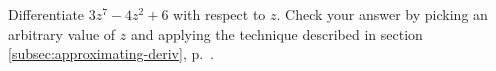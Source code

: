 Differentiate $3z^7-4z^2+6$ with respect to $z$. Check your answer by picking an
arbitrary value of $z$ and applying the technique described in section \ref{subsec:approximating-deriv},
p.~\pageref{subsec:approximating-deriv}.
